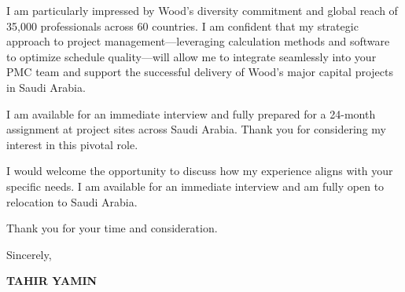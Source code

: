 \documentclass[11pt,a4paper]{article}
\begin{document}
I am particularly impressed by Wood’s diversity commitment and global reach of 35,000 professionals across 60 countries. I am confident that my strategic approach to project management—leveraging calculation methods and software to optimize schedule quality—will allow me to integrate seamlessly into your PMC team and support the successful delivery of Wood’s major capital projects in Saudi Arabia.

I am available for an immediate interview and fully prepared for a 24-month assignment at project sites across Saudi Arabia. Thank you for considering my interest in this pivotal role.

I would welcome the opportunity to discuss how my experience aligns with your specific needs. I am available for an immediate interview and am fully open to relocation to Saudi Arabia.

Thank you for your time and consideration.

\vspace{0.5cm}
Sincerely,

\vspace{0.5cm}
\textbf{TAHIR YAMIN}
\end{document}
